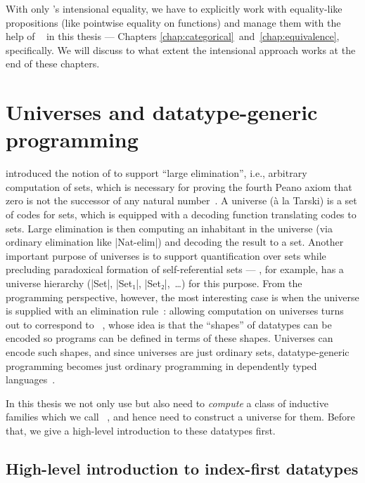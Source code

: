 With only \Agda's intensional equality, we have to explicitly work with equality-like propositions (like pointwise equality on functions) and manage them with the help of ~\citep{Barthe-setoids} in this thesis --- Chapters \ref{chap:categorical}~and~\ref{chap:equivalence}, specifically.
We will discuss to what extent the intensional approach works at the end of these chapters.

\section{Universes and datatype-generic programming}
\label{sec:universes}

\citet{ML-TT84} introduced the notion of  to support ``large elimination'', i.e., arbitrary computation of sets, which is necessary for proving the fourth Peano axiom that zero is not the successor of any natural number~\citep{Smith-independence-fourth-axiom}.
A universe (à la Tarski) is a set of codes for sets, which is equipped with a decoding function translating codes to sets.
Large elimination is then computing an inhabitant in the universe (via ordinary elimination like |Nat-elim|) and decoding the result to a set.
Another important purpose of universes is to support quantification over sets while precluding paradoxical formation of self-referential sets --- \Agda, for example, has a universe hierarchy (|Set|, |Set₁|, |Set₂|,~\ldots\!) for this purpose.
From the programming perspective, however, the most interesting case is when the universe is supplied with an elimination rule~\citep[Section~14.2]{Nordstrom-programming}: allowing computation on universes turns out to correspond to ~\citep{Gibbons-DGP}, whose idea is that the ``shapes'' of datatypes can be encoded so programs can be defined in terms of these shapes.
Universes can encode such shapes, and since universes are just ordinary sets, datatype-generic programming becomes just ordinary programming in dependently typed languages~\citep{Altenkirch-GP-within-DTP}.

In this thesis we not only use but also need to \emph{compute} a class of inductive families which we call ~\citep{Chapman-levitation, Dagand-functional-ornaments}, and hence need to construct a universe for them.
Before that, we give a high-level introduction to these datatypes first.

\subsection{High-level introduction to index-first datatypes}
\label{sec:index-first-datatypes}

